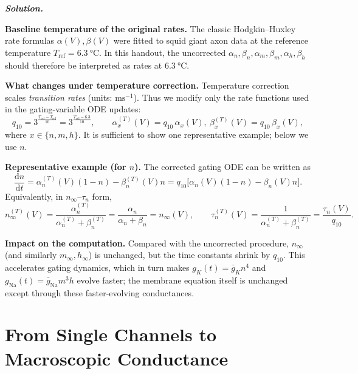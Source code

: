 \documentclass{article}
\newif\ifsolutionclearpage
\newcommand{\nosolutionpagebreak}{\global\solutionclearpagefalse}
\newenvironment{solution}{%
    \ifsolutionclearpage\clearpage\fi
    \global\solutionclearpagetrue
    \par\noindent\begin{solutionbox}\textbf{\textit{Solution.}}\par\medskip\itshape
}{%
    \end{solutionbox}
}
\renewenvironment{equation}{\begin{equation*}}{\end{equation*}}
\begin{document}
\nosolutionpagebreak
\begin{solution}
\textbf{Baseline temperature of the original rates.}
The classic Hodgkin--Huxley rate formulas $\alpha(V),\beta(V)$ were fitted to squid giant axon data at the reference temperature
$T_{\text{ref}}=\SI{6.3}{\degreeCelsius}$. In this handout, the uncorrected $\alpha_n,\beta_n,\alpha_m,\beta_m,\alpha_h,\beta_h$ should therefore be interpreted as rates at $\SI{6.3}{\degreeCelsius}$.

\textbf{What changes under temperature correction.}
Temperature correction scales \emph{transition rates} (units: $\mathrm{ms}^{-1}$). Thus we modify only the rate functions used in the gating-variable ODE updates:
\begin{equation}
q_{10}=3^{\frac{T_{\text{cel}}-T_{\text{ref}}}{10}}=3^{\frac{T_{\text{cel}}-6.3}{10}},
\qquad
\alpha_x^{(T)}(V)=q_{10}\,\alpha_x(V),\ \beta_x^{(T)}(V)=q_{10}\,\beta_x(V),
\end{equation}
where $x\in\{n,m,h\}$. It is sufficient to show one representative example; below we use $n$.

\textbf{Representative example (for $n$).}
The corrected gating ODE can be written as
\begin{equation}
\frac{\mathrm{d}n}{\mathrm{d}t}=\alpha_n^{(T)}(V)(1-n)-\beta_n^{(T)}(V)n
=q_{10}\bigl[\alpha_n(V)(1-n)-\beta_n(V)n\bigr].
\end{equation}
Equivalently, in $n_\infty$--$\tau_n$ form,
\begin{equation}
n_\infty^{(T)}(V)=\frac{\alpha_n^{(T)}}{\alpha_n^{(T)}+\beta_n^{(T)}}
=\frac{\alpha_n}{\alpha_n+\beta_n}=n_\infty(V),
\qquad
\tau_n^{(T)}(V)=\frac{1}{\alpha_n^{(T)}+\beta_n^{(T)}}=\frac{\tau_n(V)}{q_{10}}.
\end{equation}

\textbf{Impact on the computation.}
Compared with the uncorrected procedure, $n_\infty$ (and similarly $m_\infty,h_\infty$) is unchanged, but the time constants shrink by $q_{10}$.
This accelerates gating dynamics, which in turn makes $g_K(t)=\bar g_K n^4$ and $g_{\mathrm{Na}}(t)=\bar g_{\mathrm{Na}} m^3 h$ evolve faster; the membrane equation itself is unchanged except through these faster-evolving conductances.
\end{solution}

\clearpage

\section{From Single Channels to Macroscopic Conductance}
\end{document}
